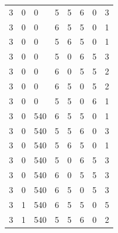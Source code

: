 \begin{refsection}
\begin{table}[H]
{\begin{tabular}{@{}llllllll@{}}
3        & 0                  & 0           & 5               & 5             & 6             & 0                  & 3                    \\
3        & 0                  & 0           & 6               & 5             & 5             & 0                  & 1                    \\
3        & 0                  & 0           & 5               & 6             & 5             & 0                  & 1                    \\
3        & 0                  & 0           & 5               & 0             & 6             & 5                  & 3                    \\
3        & 0                  & 0           & 6               & 0             & 5             & 5                  & 2                    \\
3        & 0                  & 0           & 6               & 5             & 0             & 5                  & 2                    \\
3        & 0                  & 0           & 5               & 5             & 0             & 6                  & 1                    \\
3        & 0                  & 540         & 6               & 5             & 5             & 0                  & 1                    \\
3        & 0                  & 540         & 5               & 5             & 6             & 0                  & 3                    \\
3        & 0                  & 540         & 5               & 6             & 5             & 0                  & 1                    \\
3        & 0                  & 540         & 5               & 0             & 6             & 5                  & 3                    \\
3        & 0                  & 540         & 6               & 0             & 5             & 5                  & 3                    \\
3        & 0                  & 540         & 6               & 5             & 0             & 5                  & 3                    \\
3        & 1                  & 540         & 6               & 5             & 5             & 0                  & 5                    \\
3        & 1                  & 540         & 5               & 5             & 6             & 0                  & 2                    \\

\end{tabular}}
\end{table}
\end{refsection}
